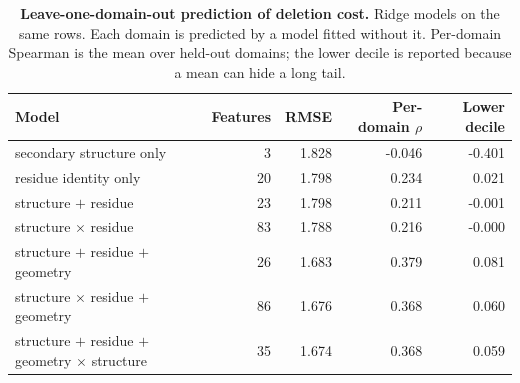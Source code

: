 \begin{table}[t]
\centering
\small
\caption{\textbf{Leave-one-domain-out prediction of deletion cost.} Ridge models on the same rows. Each domain is predicted by a model fitted without it. Per-domain Spearman is the mean over held-out domains; the lower decile is reported because a mean can hide a long tail.}
\label{tab:pred}
\begin{tabular}{lrrrr}
\toprule
Model & Features & RMSE & Per-domain $\rho$ & Lower decile \\
\midrule
secondary structure only & 3 & 1.828 & -0.046 & -0.401 \\
residue identity only & 20 & 1.798 & 0.234 & 0.021 \\
structure $+$ residue & 23 & 1.798 & 0.211 & -0.001 \\
structure $\times$ residue & 83 & 1.788 & 0.216 & -0.000 \\
structure $+$ residue $+$ geometry & 26 & 1.683 & 0.379 & 0.081 \\
structure $\times$ residue $+$ geometry & 86 & 1.676 & 0.368 & 0.060 \\
structure $+$ residue $+$ geometry $\times$ structure & 35 & 1.674 & 0.368 & 0.059 \\
\bottomrule
\end{tabular}
\end{table}
